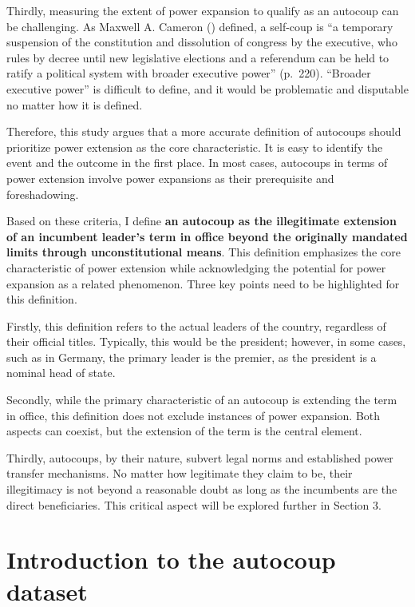 \documentclass[
  12pt,
]{report}
\begin{document}
Thirdly, measuring the extent of power expansion to qualify as an
autocoup can be challenging. As Maxwell A. Cameron
() defined, a self-coup is ``a
temporary suspension of the constitution and dissolution of congress by
the executive, who rules by decree until new legislative elections and a
referendum can be held to ratify a political system with broader
executive power'' (p.~220). ``Broader executive power'' is difficult to
define, and it would be problematic and disputable no matter how it is
defined.

Therefore, this study argues that a more accurate definition of
autocoups should prioritize power extension as the core characteristic.
It is easy to identify the event and the outcome in the first place. In
most cases, autocoups in terms of power extension involve power
expansions as their prerequisite and foreshadowing.

Based on these criteria, I define \textbf{an autocoup as the
illegitimate extension of an incumbent leader's term in office beyond
the originally mandated limits through unconstitutional means}. This
definition emphasizes the core characteristic of power extension while
acknowledging the potential for power expansion as a related phenomenon.
Three key points need to be highlighted for this definition.

Firstly, this definition refers to the actual leaders of the country,
regardless of their official titles. Typically, this would be the
president; however, in some cases, such as in Germany, the primary
leader is the premier, as the president is a nominal head of state.

Secondly, while the primary characteristic of an autocoup is extending
the term in office, this definition does not exclude instances of power
expansion. Both aspects can coexist, but the extension of the term is
the central element.

Thirdly, autocoups, by their nature, subvert legal norms and established
power transfer mechanisms. No matter how legitimate they claim to be,
their illegitimacy is not beyond a reasonable doubt as long as the
incumbents are the direct beneficiaries. This critical aspect will be
explored further in Section 3.

\section{Introduction to the autocoup
dataset}\label{introduction-to-the-autocoup-dataset}
\end{document}

